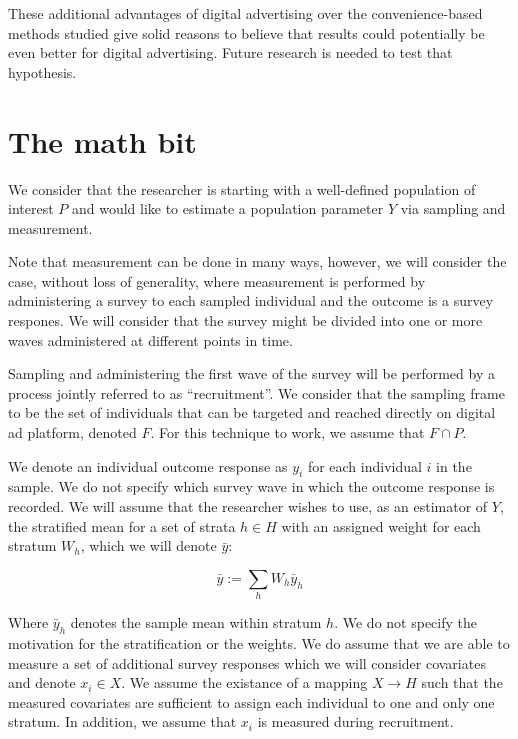 \message{ !name(survey-sampling-with-ads.tex)}\documentclass[a4paper,12pt]{article}
\theoremstyle{proposition}
\begin{document}
These additional advantages of digital advertising over the convenience-based methods studied give solid reasons to believe that results could potentially be even better for digital advertising. Future research is needed to test that hypothesis.


\section{The math bit}


We consider that the researcher is starting with a well-defined population of interest $P$ and would like to estimate a population parameter $Y$ via sampling and measurement.

Note that measurement can be done in many ways, however, we will consider the case, without loss of generality, where measurement is performed by administering a survey to each sampled individual and the outcome is a survey respones. We will consider that the survey might be divided into one or more waves administered at different points in time.

Sampling and administering the first wave of the survey will be performed by a process jointly referred to as ``recruitment''. We consider that the sampling frame to be the set of individuals that can be targeted and reached directly on digital ad platform, denoted $F$. For this technique to work, we assume that $F \cap P$.

We denote an individual outcome response as $y_i$ for each individual $i$ in the sample. We do not specify which survey wave in which the outcome response is recorded. We will assume that the researcher wishes to use, as an estimator of $Y$, the stratified mean for a set of strata $h \in H$ with an assigned weight for each stratum $W_h$, which we will denote $\bar{y}$:

$$
\bar{y} := \sum_h W_h\bar{y}_h
$$

Where $\bar{y}_h$ denotes the sample mean within stratum $h$. We do not specify the motivation for the stratification or the weights. We do assume that we are able to measure a set of additional survey responses which we will consider covariates and denote $x_i \in X$. We assume the existance of a mapping $X \rightarrow H$ such that the measured covariates are sufficient to assign each individual to one and only one stratum. In addition, we assume that $x_i$ is measured during recruitment.


\end{document}
